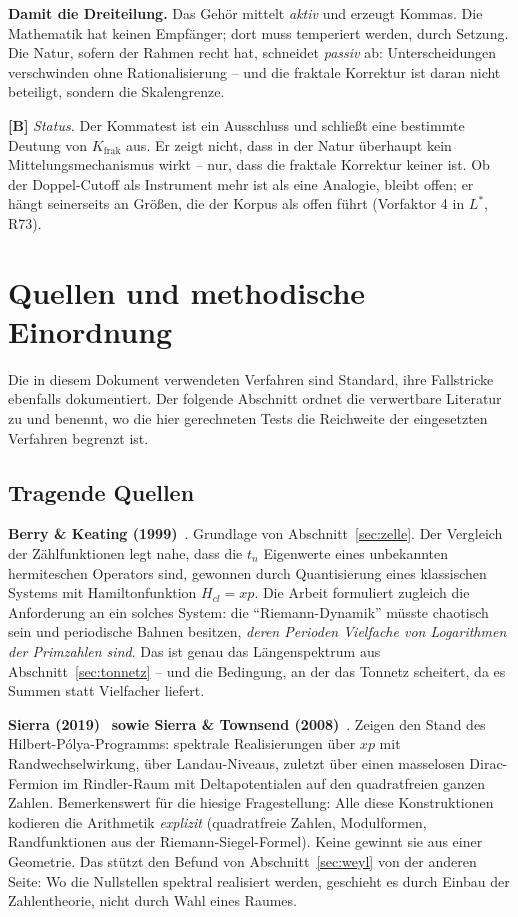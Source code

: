 \textbf{Damit die Dreiteilung.} Das Geh\"or mittelt \emph{aktiv} und
erzeugt Kommas. Die Mathematik hat keinen Empf\"anger; dort muss
temperiert werden, durch Setzung. Die Natur, sofern der Rahmen recht
hat, schneidet \emph{passiv} ab: Unterscheidungen verschwinden ohne
Rationalisierung -- und die fraktale Korrektur ist daran nicht
beteiligt, sondern die Skalengrenze.

\textbf{[B]} \emph{Status.} Der Kommatest ist ein Ausschluss und
schlie\ss t eine bestimmte Deutung von $K_\text{frak}$ aus. Er zeigt
nicht, dass in der Natur \"uberhaupt kein Mittelungsmechanismus wirkt
-- nur, dass die fraktale Korrektur keiner ist. Ob der Doppel-Cutoff
als Instrument mehr ist als eine Analogie, bleibt offen; er h\"angt
seinerseits an Gr\"o\ss en, die der Korpus als offen f\"uhrt (Vorfaktor
4 in $L^*$, R73).

\section{Quellen und methodische Einordnung}
\label{sec:quellen}

Die in diesem Dokument verwendeten Verfahren sind Standard, ihre
Fallstricke ebenfalls dokumentiert. Der folgende Abschnitt ordnet die
verwertbare Literatur zu und benennt, wo die hier gerechneten Tests
die Reichweite der eingesetzten Verfahren begrenzt ist.

\subsection{Tragende Quellen}

\textbf{Berry \& Keating (1999)}~\cite{berry1999}. Grundlage von
Abschnitt~\ref{sec:zelle}. Der Vergleich der Z\"ahlfunktionen legt
nahe, dass die $t_n$ Eigenwerte eines unbekannten hermiteschen
Operators sind, gewonnen durch Quantisierung eines klassischen Systems
mit Hamiltonfunktion $H_{cl} = xp$. Die Arbeit formuliert zugleich die
Anforderung an ein solches System: die \enquote{Riemann-Dynamik}
m\"usste chaotisch sein und periodische Bahnen besitzen, \emph{deren
Perioden Vielfache von Logarithmen der Primzahlen sind}. Das ist genau
das L\"angenspektrum aus Abschnitt~\ref{sec:tonnetz} -- und die
Bedingung, an der das Tonnetz scheitert, da es Summen statt Vielfacher
liefert.

\textbf{Sierra (2019)}~\cite{sierra2019} \textbf{sowie Sierra \& Townsend
(2008)}~\cite{sierra2008}. Zeigen den Stand des Hilbert-P\'olya-Programms: spektrale
Realisierungen \"uber $xp$ mit Randwechselwirkung, \"uber
Landau-Niveaus, zuletzt \"uber einen masselosen Dirac-Fermion im
Rindler-Raum mit Deltapotentialen auf den quadratfreien ganzen Zahlen.
Bemerkenswert f\"ur die hiesige Fragestellung: Alle diese Konstruktionen
kodieren die Arithmetik \emph{explizit} (quadratfreie Zahlen,
Modulformen, Randfunktionen aus der Riemann-Siegel-Formel). Keine
gewinnt sie aus einer Geometrie. Das st\"utzt den Befund von
Abschnitt~\ref{sec:weyl} von der anderen Seite: Wo die Nullstellen
spektral realisiert werden, geschieht es durch Einbau der
Zahlentheorie, nicht durch Wahl eines Raumes.

